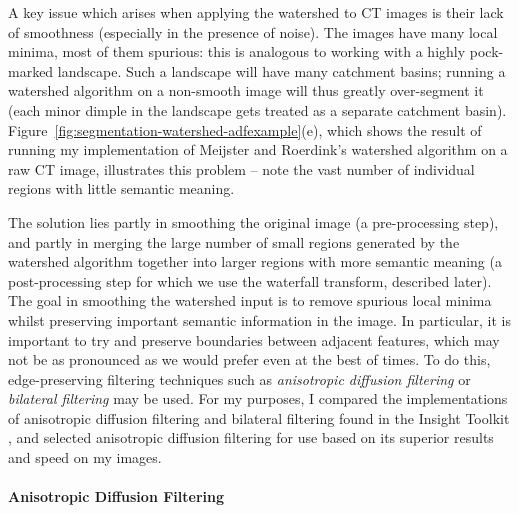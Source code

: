 A key issue which arises when applying the watershed to CT images is their lack of smoothness (especially in the presence of noise). The images have many local minima, most of them spurious: this is analogous to working with a highly pock-marked landscape. Such a landscape will have many catchment basins; running a watershed algorithm on a non-smooth image will thus greatly over-segment it (each minor dimple in the landscape gets treated as a separate catchment basin). Figure~\ref{fig:segmentation-watershed-adfexample}(e), which shows the result of running my implementation of Meijster and Roerdink's watershed algorithm on a raw CT image, illustrates this problem -- note the vast number of individual regions with little semantic meaning.

The solution lies partly in smoothing the original image (a pre-processing step), and partly in merging the large number of small regions generated by the watershed algorithm together into larger regions with more semantic meaning (a post-processing step for which we use the waterfall transform, described later). The goal in smoothing the watershed input is to remove spurious local minima whilst preserving important semantic information in the image. In particular, it is important to try and preserve boundaries between adjacent features, which may not be as pronounced as we would prefer even at the best of times. To do this, edge-preserving filtering techniques such as \emph{anisotropic diffusion filtering} \cite{perona90} or \emph{bilateral filtering} \cite{tomasi98} may be used. For my purposes, I compared the implementations of anisotropic diffusion filtering and bilateral filtering found in the Insight Toolkit \cite{itk}, and selected anisotropic diffusion filtering for use based on its superior results and speed on my images.

\paragraph{Anisotropic Diffusion Filtering}


